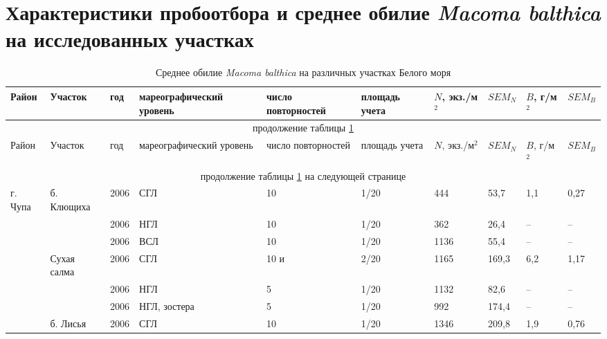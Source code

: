 \section{Характеристики пробоотбора и среднее обилие {\it Macoma balthica} на исследованных участках}
\label{app:NB_table}
	\begin{footnotesize}
    \begin{center}
	\begin{longtable}{|p{1.6cm}|p{2.3cm}|p{0.8cm}|p{1.8cm}|p{1.1cm}|p{1.1cm}|*{4}{p{1cm}|}}
	\caption{Среднее обилие {\it Macoma balthica} на различных участках Белого моря} \label{tab:mean_NB_White}\\
	\hline
	Район & Участок & год & ма\-ре\-ографи\-ческий уровень & число повторностей & пло\-щадь учета & $N$, экз./м$^2$ & $SEM_N$  & $B$, г/м$^2$ & $SEM_B$
	\\ \hline \endfirsthead
	\hline
	\multicolumn{10}{|c|}{продолжение таблицы \ref{tab:mean_NB_White}} \\ \hline
	Район & Участок & год & ма\-ре\-ографи\-ческий уровень & число повторностей & пло\-щадь учета & $N$, экз./м$^2$ & $SEM_N$  & $B$, г/м$^2$ & $SEM_B$ 
	\\ \hline \endhead
	\hline 
	\multicolumn{10}{|c|}{продолжение таблицы \ref{tab:mean_NB_White} на следующей странице}
	\\ \hline \endfoot
	 \endlastfoot
г. Чупа            & б. Клющиха                     & 2006 & СГЛ               & 10   & 1/20 & 444  & 53,7   & 1,1   & 0,27  \\
                   &                                & 2006 & НГЛ               & 10   & 1/20 & 362  & 26,4   & --    & --    \\
                   &                                & 2006 & ВСЛ               & 10   & 1/20 & 1136 & 55,4   & --    & --    \\ \cline{2-10}
                   & Сухая салма                    & 2006 & СГЛ               & 10 и & 2/20 & 1165 & 169,3  & 6,2   & 1,17  \\
                   &                                & 2006 & НГЛ               & 5    & 1/20 & 1132 & 82,6   & --    & --    \\
                   &                                & 2006 & НГЛ, зостера      & 5    & 1/20 & 992  & 174,4  & --    & --    \\\cline{2-10}
                   & б. Лисья                       & 2006 & СГЛ               & 10   & 1/20 & 1346 & 209,8  & 1,9   & 0,76  \\

\end{longtable}
\end{center}
\end{footnotesize}

